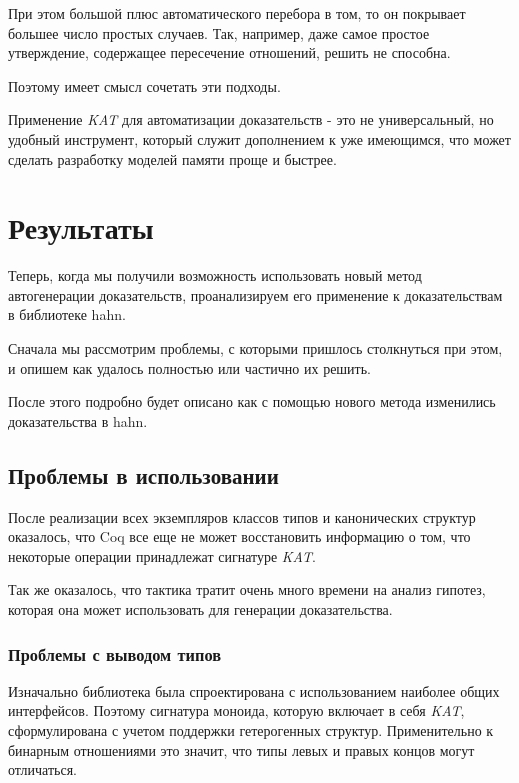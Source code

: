 \documentclass[times
              ]{itmo-student-thesis}
\begin{document}
    При этом большой плюс автоматического перебора в том, то он покрывает большее число простых
    случаев. Так, например, даже самое простое утверждение, содержащее пересечение отношений,
     решить не способна.

    Поэтому имеет смысл сочетать эти подходы.

  \chapterconclusion
    Применение \textit{KAT} для автоматизации доказательств - это не универсальный, но удобный
    инструмент, который служит дополнением к уже имеющимся, что может сделать  разработку моделей
    памяти проще и быстрее.

\chapter{Результаты}

  Теперь, когда мы получили возможность использовать новый метод автогенерации доказательств, проанализируем его
  применение к доказательствам в библиотеке hahn.

  Сначала мы рассмотрим проблемы, с которыми пришлось столкнуться при этом, и опишем как удалось полностью или
  частично их решить.

  После этого подробно будет описано как с помощью нового метода изменились доказательства в hahn.

  \section{Проблемы в использовании }
    После реализации всех экземпляров классов типов и канонических структур оказалось, что Coq все еще
    не может восстановить информацию о том, что некоторые операции принадлежат сигнатуре \textit{KAT}.

    Так же оказалось, что тактика  тратит очень много времени на анализ гипотез, которая она
    может использовать для генерации доказательства.
    \subsection{Проблемы с выводом типов}
      Изначально библиотека была спроектирована с использованием наиболее общих интерфейсов. Поэтому
      сигнатура моноида, которую включает в себя \textit{KAT}, сформулирована с учетом
      поддержки гетерогенных структур.
      Применительно к бинарным отношениями это значит, что типы левых и правых концов могут
      отличаться.
\end{document}
